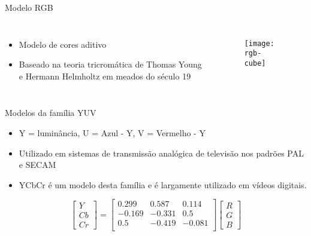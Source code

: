 \begin{frame}{Modelo RGB}
\begin{columns}
\begin{itemize}
    \item Modelo de cores aditivo
    \item Baseado na teoria tricromática de Thomas Young e Hermann Helmholtz em meados do século 19
\end{itemize}
\begin{figure}[!h]
  \centering
  \texttt{[image: rgb-cube]}
\end{figure}
\end{columns}
\end{frame}

\begin{frame}{Modelos da família YUV}
\begin{itemize}
    \item Y = luminância, U = Azul - Y, V = Vermelho - Y
    \item Utilizado em sistemas de transmissão analógica de televisão nos padrões PAL e SECAM
    \item YCbCr é um modelo desta família e é largamente utilizado em vídeos digitais.
\end{itemize}
\begin{equation*}
  \begin{bmatrix}
    Y \\ Cb \\ Cr
  \end{bmatrix} = 
  \begin{bmatrix}
     0.299 &  0.587 &  0.114 \\
    -0.169 & -0.331 &  0.5   \\
     0.5   & -0.419 & -0.081 \\
  \end{bmatrix}
  \begin{bmatrix}
    R \\ G \\ B
  \end{bmatrix}
\end{equation*}
\end{frame}

